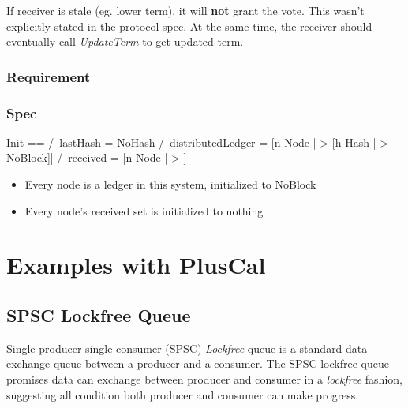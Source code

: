 \documentclass{report}
\begin{document}
If receiver is stale (eg. lower term), it will \textbf{not} grant the vote.
This wasn't explicitly stated in the protocol spec. At the same time, the
receiver should eventually call \textit{UpdateTerm} to get updated term. 



% 


\section{Requirement}

\section{Spec}

\begin{tla}
Init ==
    /\ lastHash = NoHash
    /\ distributedLedger = [n \in Node |-> [h \in Hash |-> NoBlock]]
    /\ received = [n \in Node |-> {}]
\end{tla}
\begin{tlatex}
%
%
%
\end{tlatex}
\newline

\begin{itemize}
    \item Every node is a ledger in this system, initialized to NoBlock
    \item Every node's received set is initialized to nothing
\end{itemize}

\part{Examples with PlusCal}

\chapter{SPSC Lockfree Queue}

Single producer single consumer (SPSC) \textit{Lockfree} queue is a standard
data exchange queue between a producer and a consumer. The SPSC lockfree queue
promises data can exchange between producer and consumer in a \textit{lockfree}
fashion, suggesting all condition both producer and consumer can make
progress.\newline
\end{document}
